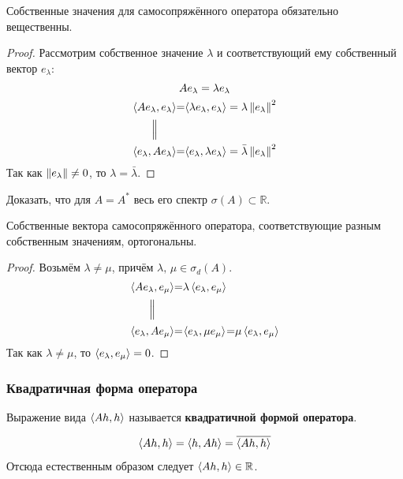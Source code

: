 \documentclass[12pt]{article}
\begin{document}
	\begin{state} \label{st:realeigenvalues}
		Собственные значения для самосопряжённого оператора обязательно вещественны.
	\end{state}
	\begin{proof}
		Рассмотрим собственное значение $\lambda$ и соответствующий ему собственный вектор $e_{\lambda}$:
		\begin{gather*}
			Ae_{\lambda} = \lambda e_{\lambda} \\
			\begin{CD}
				\scal{Ae_{\lambda}}{e_{\lambda}} @.=@. \scal{\lambda e_{\lambda}}{e_{\lambda}} = \lambda \norm{e_{\lambda}}^2 \\
				@| \\
				\scal{e_{\lambda}}{Ae_{\lambda}} @.=@. \scal{e_{\lambda}}{\lambda e_{\lambda}} = \bar{\lambda} \norm{e_{\lambda}}^2 
			\end{CD}
		\end{gather*}
		Так как $\left\| e_{\lambda} \right\| \neq 0$, то $\lambda = \bar{\lambda}$.
	\end{proof}
	\exc Доказать, что для $A = A^{*}$ весь его спектр $\sigma(A) \subset \mathbb{R}$.
	
	\begin{note}
		Собственные вектора самосопряжённого оператора, соответствующие разным собственным значениям, ортогональны.
	\end{note}
	\begin{proof} %
		Возьмём $\lambda \neq \mu$, причём $\lambda,\, \mu \in \sigma_d(A)$.
		$$
			\begin{CD}
				\scal{Ae_{\lambda}}{e_{\mu}} @.=@. \lambda\scal{e_{\lambda}}{e_{\mu}} \\
				@| \\
				\scal{e_{\lambda}}{Ae_{\mu}} @.=@. \scal{e_{\lambda}}{\mu e_{\mu}} @.=@. \mu\scal{e_{\lambda}}{e_{\mu}}
			\end{CD}
		$$
		Так как $\lambda \neq \mu$, то $\left\langle e_{\lambda}, e_{\mu} \right\rangle = 0$.
	\end{proof}
	
	\subsubsection{Квадратичная форма оператора}
	\begin{defi}
		Выражение вида $\left\langle Ah, h \right\rangle$ называется \textbf{квадратичной формой оператора}.
	\end{defi}
	
	\begin{state}
		$$\left\langle Ah, h \right\rangle = \left\langle h, Ah \right\rangle = \overline{\left\langle Ah, h \right\rangle}$$
		Отсюда естественным образом следует $\left\langle Ah, h \right\rangle \in \mathbb{R}$.
	\end{state}
	
\end{document}
